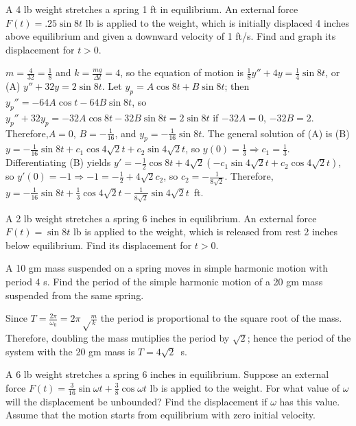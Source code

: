 \documentclass{ximera}
\begin{document}
\begin{problem}\label{exer:6.1.12} 
A 4 lb weight stretches a spring 1 ft in equilibrium. An external
force $F(t)=.25\sin8 t$ lb is applied to the weight, which is
initially displaced 4 inches above equilibrium and given a downward
velocity of 1 ft/s. Find and graph its displacement for $t>0$.

\begin{solution}
$m=\frac{4}{32}=\frac{1}{8}$ and $k=\frac{mg}{\Delta l}=4$, so
the equation of motion is $\frac{1}{8}y''+4y =\frac{1}{4}\sin8t$,
or (A) $y''+32y=2\sin8t$. Let $y_p=A\cos8t+B\sin8t$; then
$y_p''=-64A\cos t-64B\sin8t$, so $y_p''+32y_p=-32A\cos8t-32B\sin8t=
2\sin8t$ if $-32A=0$, $-32B=2$. Therefore,$A=0$, $B=-\frac{1}{16}$,
and $y_p=-\frac{1}{16}\sin8t$. The general solution of (A) is (B)
$y=-\frac{1}{16}\sin8t+c_1\cos4\sqrt2t+c_2\sin4\sqrt2t$, so
$y(0)=\frac{1}{3}\Rightarrow c_1=\frac{1}{3}$. Differentiating (B)
yields $y'=-\frac{1}{2}\cos
8t+4\sqrt2(-c_1\sin4\sqrt2t+c_2\cos4\sqrt2t)$, so $y'(0)=-1\Rightarrow
-1=-\frac{1}{2}+4\sqrt2c_2$, so $c_2=-\frac{1}{8\sqrt2}$.
Therefore,$y=-\frac{1}{16}\sin8t+\frac{1}{3}\cos4\sqrt2t
-\frac{1}{8\sqrt2 }\sin 4\sqrt2t$~ft.
\end{solution}
\end{problem}

\begin{problem}\label{exer:6.1.13}
A 2 lb weight stretches a spring 6 inches in equilibrium.  An external
force $F(t)=\sin8t$ lb is applied to the weight, which is released
from rest 2 inches below equilibrium. Find its displacement
for $t>0$.
\end{problem}

\begin{problem}\label{exer:6.1.14}
A 10 gm mass suspended on a spring moves in simple harmonic
motion with period 4 s.  Find the period of the simple
harmonic motion of a 20 gm mass suspended from the same spring.

\begin{solution}
    Since $T=\frac{2\pi}{\omega_0}=2\pi\sqrt\frac{m}{k}$
the period is proportional to the square root of the mass.
Therefore, doubling the mass mutiplies the period by $\sqrt2$;
hence the period of the system with the 20 gm mass is
 $T=4\sqrt{2}$~s.
\end{solution}
\end{problem}

\begin{problem}\label{exer:6.1.15}
A 6 lb weight stretches a spring 6 inches in equilibrium. Suppose
an external force $F(t)=\frac{3}{16}\sin\omega
t+\frac{3}{8}\cos\omega t $ lb is applied to the weight. For what
value
of $\omega$ will the displacement be unbounded? Find the displacement
if $\omega$ has this value. Assume that the motion starts from
equilibrium with zero initial velocity.
\end{problem}
\end{document}

